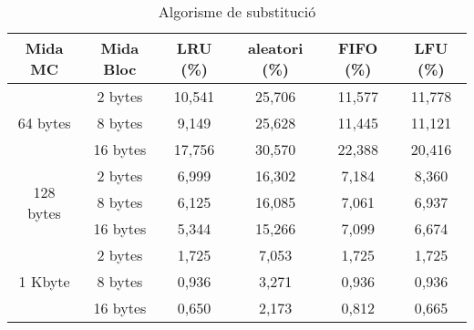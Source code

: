 \documentclass{article}
\begin{document}
\begin{table}[!h]
\centering
\begin{tabular}{|c|c|c|c|c|c|}
\hline
Mida MC & Mida Bloc & LRU (\%) & aleatori (\%) & FIFO (\%) & LFU (\%) \\
\hline
\multirow{3}{4em}{64 bytes}     & 2 bytes   & 10,541   & 25,706        & 11,577    & 11,778   \\
         & 8 bytes   & 9,149    & 25,628        & 11,445    & 11,121   \\
         & 16 bytes  & 17,756   & 30,570        & 22,388    & 20,416   \\
\hline
\multirow{3}{4em}{128 bytes}    & 2 bytes   & 6,999    & 16,302        & 7,184     & 8,360    \\
         & 8 bytes   & 6,125    & 16,085        & 7,061     & 6,937    \\
         & 16 bytes  & 5,344    & 15,266        & 7,099     & 6,674    \\
\hline
\multirow{3}{4em}{1 Kbyte}      & 2 bytes   & 1,725    & 7,053         & 1,725     & 1,725    \\
         & 8 bytes   & 0,936    & 3,271         & 0,936     & 0,936    \\
         & 16 bytes  & 0,650    & 2,173         & 0,812     & 0,665   
\\
\hline
\end{tabular}
\caption{Algorisme de substitució}
\label{tab:sub}
\end{table}
\end{document}
